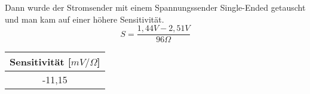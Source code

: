 Dann wurde der Stromsender mit einem Spannungssender Single-Ended getauscht und man kam auf einer höhere Sensitivität.
\begin{equation}
	S = \dfrac{1,44V - 2,51V}{96\Omega}
	\label{eq:sens}
\end{equation}

\begin{table}[!h]
	\centering
	\begin{tabular}{|c|}
		\hline 
		Sensitivität [$mV / \Omega$]		\\ 
		\hline 
		-11,15		\\ 
		\hline 
	\end{tabular}
\end{table}





